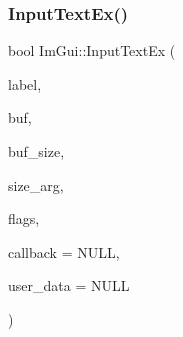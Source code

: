 \subsubsection{\texorpdfstring{Input\+Text\+Ex()}{InputTextEx()}}
{\footnotesize\ttfamily bool Im\+Gui\+::\+Input\+Text\+Ex (\begin{DoxyParamCaption}\item[{const char $\ast$}]{label,  }\item[{char $\ast$}]{buf,  }\item[{int}]{buf\+\_\+size,  }\item[{const \mbox{\hyperlink{struct_im_vec2}{Im\+Vec2}} \&}]{size\+\_\+arg,  }\item[{\mbox{\hyperlink{imgui_8h_a7d2c6153a6b9b5d3178ce82434ac9fb8}{Im\+Gui\+Input\+Text\+Flags}}}]{flags,  }\item[{\mbox{\hyperlink{imgui_8h_a65fd2b568a62c9aa2a28a8a13eb65ad7}{Im\+Gui\+Input\+Text\+Callback}}}]{callback = {\ttfamily NULL},  }\item[{void $\ast$}]{user\+\_\+data = {\ttfamily NULL} }\end{DoxyParamCaption})}

